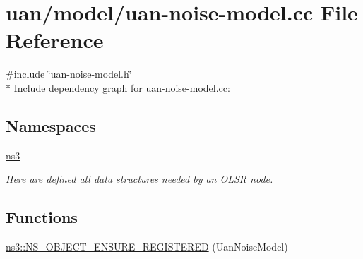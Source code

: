 \hypertarget{uan-noise-model_8cc}{}\section{uan/model/uan-\/noise-\/model.cc File Reference}
\label{uan-noise-model_8cc}
{\ttfamily \#include \char`\"{}uan-\/noise-\/model.\+h\char`\"{}}\\*
Include dependency graph for uan-\/noise-\/model.cc\+:
\subsection*{Namespaces}
\begin{DoxyCompactItemize}
\item 
 \hyperlink{namespacens3}{ns3}
\begin{DoxyCompactList}\small\item\em Here are defined all data structures needed by an O\+L\+SR node. \end{DoxyCompactList}\end{DoxyCompactItemize}
\subsection*{Functions}
\begin{DoxyCompactItemize}
\item 
\hyperlink{namespacens3_a85a0433887bb1d614e13ce8135b97005}{ns3\+::\+N\+S\+\_\+\+O\+B\+J\+E\+C\+T\+\_\+\+E\+N\+S\+U\+R\+E\+\_\+\+R\+E\+G\+I\+S\+T\+E\+R\+ED} (Uan\+Noise\+Model)
\end{DoxyCompactItemize}
